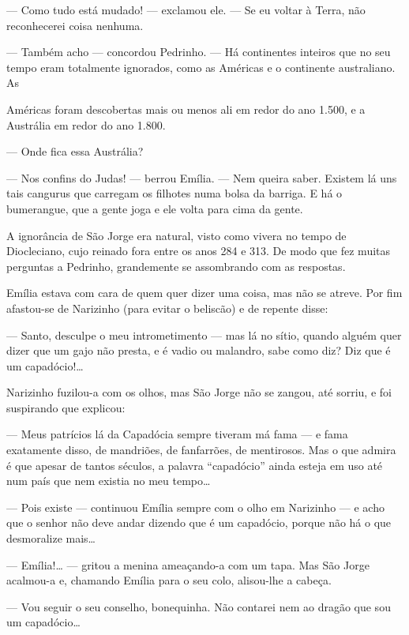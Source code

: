 --- Como tudo está mudado! --- exclamou ele. --- Se eu voltar à Terra,
não reconhecerei coisa nenhuma.

--- Também acho --- concordou Pedrinho. --- Há continentes inteiros que
no seu tempo eram totalmente ignorados, como as Américas e o continente
australiano. As

Américas foram descobertas mais ou menos ali em redor do ano 1.500, e a
Austrália em redor do ano 1.800.

--- Onde fica essa Austrália?

--- Nos confins do Judas! --- berrou Emília. --- Nem queira saber.
Existem lá uns tais cangurus que carregam os filhotes numa bolsa da
barriga. E há o bumerangue, que a gente joga e ele volta para cima da
gente.

A ignorância de São Jorge era natural, visto como vivera no tempo de
Diocleciano, cujo reinado fora entre os anos 284 e 313. De modo que fez
muitas perguntas a Pedrinho, grandemente se assombrando com as
respostas.

Emília estava com cara de quem quer dizer uma coisa, mas não se atreve.
Por fim afastou-se de Narizinho (para evitar o beliscão) e de repente
disse:

--- Santo, desculpe o meu intrometimento --- mas lá no sítio, quando
alguém quer dizer que um gajo não presta, e é vadio ou malandro, sabe
como diz? Diz que é um capadócio!\ldots{}

Narizinho fuzilou-a com os olhos, mas São Jorge não se zangou, até
sorriu, e foi suspirando que explicou:

--- Meus patrícios lá da Capadócia sempre tiveram má fama --- e fama
exatamente disso, de mandriões, de fanfarrões, de mentirosos. Mas o que
admira é que apesar de tantos séculos, a palavra ``capadócio'' ainda
esteja em uso até num país que nem existia no meu tempo\ldots{}

--- Pois existe --- continuou Emília sempre com o olho em Narizinho ---
e acho que o senhor não deve andar dizendo que é um capadócio, porque
não há o que desmoralize mais\ldots{}

--- Emília!\ldots{} --- gritou a menina ameaçando-a com um tapa. Mas São
Jorge acalmou-a e, chamando Emília para o seu colo, alisou-lhe a cabeça.

--- Vou seguir o seu conselho, bonequinha. Não contarei nem ao dragão
que sou um capadócio\ldots{}


